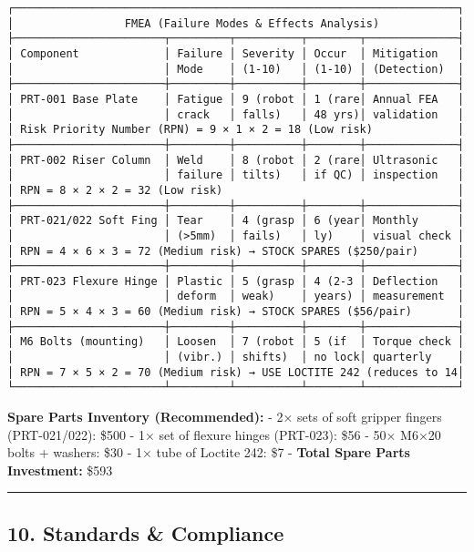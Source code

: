 \documentclass[
]{article}
\begin{document}
\begin{verbatim}
┌────────────────────────────────────────────────────────────────────┐
│                 FMEA (Failure Modes & Effects Analysis)            │
├───────────────────────┬─────────┬──────────┬────────┬──────────────┤
│ Component             │ Failure │ Severity │ Occur  │ Mitigation   │
│                       │ Mode    │ (1-10)   │ (1-10) │ (Detection)  │
├───────────────────────┼─────────┼──────────┼────────┼──────────────┤
│ PRT-001 Base Plate    │ Fatigue │ 9 (robot │ 1 (rare│ Annual FEA   │
│                       │ crack   │ falls)   │ 48 yrs)│ validation   │
│ Risk Priority Number (RPN) = 9 × 1 × 2 = 18 (Low risk)             │
├───────────────────────┼─────────┼──────────┼────────┼──────────────┤
│ PRT-002 Riser Column  │ Weld    │ 8 (robot │ 2 (rare│ Ultrasonic   │
│                       │ failure │ tilts)   │ if QC) │ inspection   │
│ RPN = 8 × 2 × 2 = 32 (Low risk)                                    │
├───────────────────────┼─────────┼──────────┼────────┼──────────────┤
│ PRT-021/022 Soft Fing │ Tear    │ 4 (grasp │ 6 (year│ Monthly      │
│                       │ (>5mm)  │ fails)   │ ly)    │ visual check │
│ RPN = 4 × 6 × 3 = 72 (Medium risk) → STOCK SPARES ($250/pair)      │
├───────────────────────┼─────────┼──────────┼────────┼──────────────┤
│ PRT-023 Flexure Hinge │ Plastic │ 5 (grasp │ 4 (2-3 │ Deflection   │
│                       │ deform  │ weak)    │ years) │ measurement  │
│ RPN = 5 × 4 × 3 = 60 (Medium risk) → STOCK SPARES ($56/pair)       │
├───────────────────────┼─────────┼──────────┼────────┼──────────────┤
│ M6 Bolts (mounting)   │ Loosen  │ 7 (robot │ 5 (if  │ Torque check │
│                       │ (vibr.) │ shifts)  │ no lock│ quarterly    │
│ RPN = 7 × 5 × 2 = 70 (Medium risk) → USE LOCTITE 242 (reduces to 14│
└───────────────────────┴─────────┴──────────┴────────┴──────────────┘
\end{verbatim}

\textbf{Spare Parts Inventory (Recommended):} - 2× sets of soft gripper
fingers (PRT-021/022): \$500 - 1× set of flexure hinges (PRT-023): \$56
- 50× M6×20 bolts + washers: \$30 - 1× tube of Loctite 242: \$7 -
\textbf{Total Spare Parts Investment:} \$593

\begin{center}\rule{0.5\linewidth}{0.5pt}\end{center}

\hypertarget{standards-compliance}{%
\subsection{10. Standards \& Compliance}\label{standards-compliance}}
\end{document}
